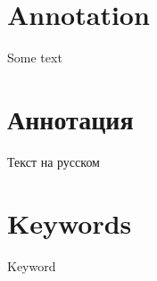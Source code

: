 \newpage
\section*{Annotation}

Some text

\section*{\foreignlanguage{russian}{Аннотация}}
\foreignlanguage{russian}{
	Текст на русском
}

\section*{Keywords}
Keyword

\pagebreak